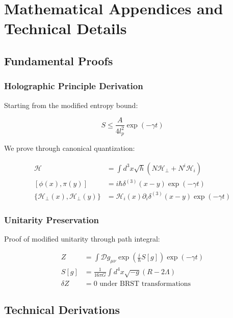 \documentclass[12pt]{article}
\theoremstyle{plain}
\theoremstyle{definition}
\theoremstyle{remark}
\begin{document}
\section{Mathematical Appendices and Technical Details}

\subsection{Fundamental Proofs}

\subsubsection{Holographic Principle Derivation}

Starting from the modified entropy bound:

\begin{equation}
S \leq \frac{A}{4l_p^2}\exp(-\gamma t)
\end{equation}

We prove through canonical quantization:

\begin{equation}
\begin{aligned}
\mathcal{H} &= \int d^3x \sqrt{h}(N\mathcal{H}_\perp + N^i\mathcal{H}_i) \\
[\phi(x),\pi(y)] &= i\hbar\delta^{(3)}(x-y)\exp(-\gamma t) \\
\{\mathcal{H}_\perp(x),\mathcal{H}_\perp(y)\} &= \mathcal{H}_i(x)\partial_i\delta^{(3)}(x-y)\exp(-\gamma t)
\end{aligned}
\end{equation}

\subsubsection{Unitarity Preservation}

Proof of modified unitarity through path integral:

\begin{equation}
\begin{aligned}
Z &= \int \mathcal{D}g_{\mu\nu}\exp\left(\frac{i}{\hbar}S[g]\right)\exp(-\gamma t) \\
S[g] &= \frac{1}{16\pi G}\int d^4x\sqrt{-g}(R - 2\Lambda) \\
\delta Z &= 0 \text{ under BRST transformations}
\end{aligned}
\end{equation}

\subsection{Technical Derivations}
\end{document}
